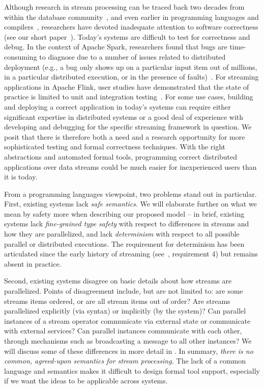 Although research in stream processing can be traced back two decades from within the database community~\cite{Aurora,Borealis,STREAM2004,Telegraph,ABW2006CQL},
and even earlier in programming languages and compilers~\cite{burge1975stream,stephens1997survey,thies2002streamit},
researchers have devoted inadequate attention to software correctness (see our short paper~).
Today's systems are difficult to test for correctness and debug. In the context of Apache Spark, researchers found that bugs are time-consuming to diagnose due to a number of issues related to distributed deployment (e.g., a bug only shows up on a particular input item out of millions, in a particular distributed execution, or in the presence of faults)~\cite{gulzar2016bigdebug}. For streaming applications in Apache Flink, user studies have demonstrated that the state of practice is limited to unit and integration testing~\cite{vianna2019exploratory}.
For some use cases, building and deploying a correct application in today's systems can require either significant expertise in distributed systems or a good deal of experience with developing and debugging for the specific streaming framework in question. We posit that there is therefore both a need and a research opportunity for more sophisticated testing and formal correctness techniques. With the right abstractions and automated formal tools, programming correct distributed applications over data streams could be much easier for inexperienced users than it is today.

From a programming languages viewpoint, two problems stand out in particular. First, existing systems lack \emph{safe semantics}. We will elaborate further on what we mean by safety more when describing our proposed model -- in brief, existing systems lack \emph{fine-grained type safety} with respect to differences in streams and how they are parallelized, and lack \emph{determinism} with respect to all possible parallel or distributed executions. The requirement for determinism has been articulated since the early history of streaming (see~\cite{stonebraker20058}, requirement 4) but remains absent in practice.

Second, existing systems disagree on basic details about how streams are parallelized. Points of disagreement include, but are not limited to: are some streams items ordered, or are all stream items out of order? Are streams parallelized explicitly (via syntax) or implicitly (by the system)? Can parallel instances of a stream operator communicate via external state or communicate with external services? Can parallel instances communicate with each other, through mechanisms such as broadcasting a message to all other instances? We will discuss some of these differences in more detail in . In summary, \emph{there is no common, agreed-upon semantics for stream processing.} The lack of a common language and semantics makes it difficult to design formal tool support, especially if we want the ideas to be applicable across systems.

